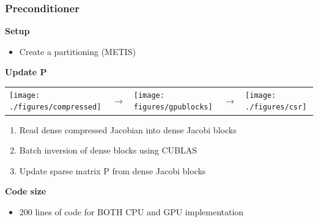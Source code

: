 \begin{frame}
  \frametitle{Preconditioner}
  {\bf Setup}
  \begin{itemize}
    \item Create a partitioning (METIS)
  \end{itemize}
  {\bf Update P}
  \begin{tabular}{m{}m{}m{}m{}m{}}
        \texttt{[image: ./figures/compressed]}
    &
    {\Huge $\rightarrow$}
    &
        \texttt{[image: figures/gpublocks]}
    &
    {\Huge $\rightarrow$}
    &
        \texttt{[image: ./figures/csr]}
    \\
  \end{tabular}
    \begin{enumerate}
      \item Read dense compressed Jacobian into dense Jacobi blocks
      \item Batch inversion of dense blocks using CUBLAS
      \item Update sparse matrix P from dense Jacobi blocks
    \end{enumerate}
  {\bf Code size}
  \begin{itemize}
    \item 200 lines of code for BOTH CPU and GPU implementation
  \end{itemize}
\end{frame}

